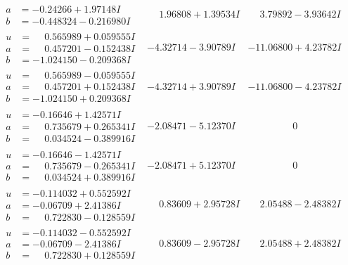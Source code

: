 \documentclass[1p]{elsarticle_modified}
\theoremstyle{definition}
\begin{document}
$$\begin{array}{c|c|c}
\begin{aligned}
a &= -0.24266 + 1.97148 I \\
b &= -0.448324 - 0.216980 I\end{aligned}
 & \phantom{-}1.96808 + 1.39534 I & \phantom{-}3.79892 - 3.93642 I \\ \hline\begin{aligned}
u &= \phantom{-}0.565989 + 0.059555 I \\
a &= \phantom{-}0.457201 - 0.152438 I \\
b &= -1.024150 - 0.209368 I\end{aligned}
 & -4.32714 - 3.90789 I & -11.06800 + 4.23782 I \\ \hline\begin{aligned}
u &= \phantom{-}0.565989 - 0.059555 I \\
a &= \phantom{-}0.457201 + 0.152438 I \\
b &= -1.024150 + 0.209368 I\end{aligned}
 & -4.32714 + 3.90789 I & -11.06800 - 4.23782 I \\ \hline\begin{aligned}
u &= -0.16646 + 1.42571 I \\
a &= \phantom{-}0.735679 + 0.265341 I \\
b &= \phantom{-}0.034524 - 0.389916 I\end{aligned}
 & -2.08471 - 5.12370 I & \phantom{-0.000000 } 0 \\ \hline\begin{aligned}
u &= -0.16646 - 1.42571 I \\
a &= \phantom{-}0.735679 - 0.265341 I \\
b &= \phantom{-}0.034524 + 0.389916 I\end{aligned}
 & -2.08471 + 5.12370 I & \phantom{-0.000000 } 0 \\ \hline\begin{aligned}
u &= -0.114032 + 0.552592 I \\
a &= -0.06709 + 2.41386 I \\
b &= \phantom{-}0.722830 - 0.128559 I\end{aligned}
 & \phantom{-}0.83609 + 2.95728 I & \phantom{-}2.05488 - 2.48382 I \\ \hline\begin{aligned}
u &= -0.114032 - 0.552592 I \\
a &= -0.06709 - 2.41386 I \\
b &= \phantom{-}0.722830 + 0.128559 I\end{aligned}
 & \phantom{-}0.83609 - 2.95728 I & \phantom{-}2.05488 + 2.48382 I \\ \hline\begin{aligned}

\end{aligned}
\end{array}$$
\end{document}
